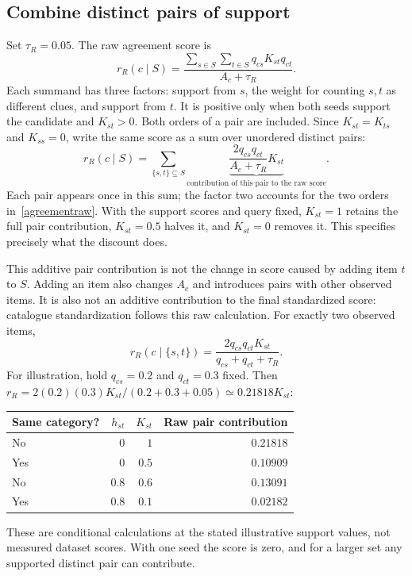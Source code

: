 \documentclass[11pt,a4paper]{article}
\numberwithin{equation}{section}
\begin{document}
\subsection{Combine distinct pairs of support}
Set $\tau_R=0.05$. The raw agreement score is
\begin{equation}\label{agreementraw}
 \boxed{r_R(c\mid S)=
 \frac{\displaystyle\sum_{s\in S}\sum_{t\in S}q_{cs}K_{st}q_{ct}}
      {A_c+\tau_R}.}
\end{equation}
Each summand has three factors: support from $s$, the weight for counting $s,t$
as different clues, and support from $t$. It is positive only when both seeds
support the candidate and $K_{st}>0$. Both orders of a pair are included.
Since $K_{st}=K_{ts}$ and $K_{ss}=0$, write the same score as a sum over
unordered distinct pairs:
\begin{equation}
 r_R(c\mid S)=\sum_{\{s,t\}\subseteq S}
 \underbrace{\frac{2q_{cs}q_{ct}}{A_c+\tau_R}K_{st}}
 _{\text{contribution of this pair to the raw score}}.
\end{equation}
Each pair appears once in this sum; the factor two accounts for the two orders
in~\eqref{agreementraw}. With the support scores and query fixed, $K_{st}=1$
retains the full pair contribution, $K_{st}=0.5$ halves it, and $K_{st}=0$
removes it. This specifies precisely what the discount does.

This additive pair contribution is not the change in score caused by adding
item $t$ to $S$. Adding an item also changes $A_c$ and introduces pairs with
other observed items. It is also not an additive contribution to the final
standardized score: catalogue standardization follows this raw calculation.
For exactly two observed items,
\[
 r_R(c\mid\{s,t\})=\frac{2q_{cs}q_{ct}K_{st}}{q_{cs}+q_{ct}+\tau_R}.
\]
For illustration, hold $q_{cs}=0.2$ and $q_{ct}=0.3$ fixed. Then
$r_R=2(0.2)(0.3)K_{st}/(0.2+0.3+0.05)\simeq0.21818K_{st}$:
\begin{center}\small
\begin{tabular}{@{}lrrr@{}}\toprule
Same category? & $h_{st}$ & $K_{st}$ & Raw pair contribution \\\midrule
No & $0$ & $1$ & $0.21818$ \\
Yes & $0$ & $0.5$ & $0.10909$ \\
No & $0.8$ & $0.6$ & $0.13091$ \\
Yes & $0.8$ & $0.1$ & $0.02182$ \\\bottomrule
\end{tabular}\end{center}
These are conditional calculations at the stated illustrative support values,
not measured dataset scores. With one seed the score is zero, and for a larger
set any supported distinct pair can contribute.
\end{document}
